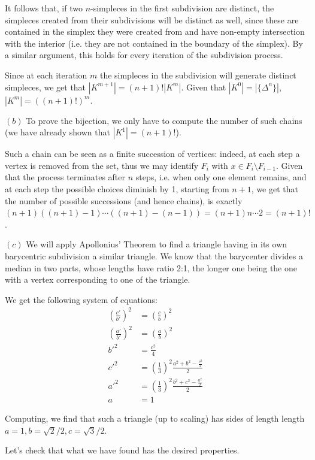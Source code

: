 \documentclass{article}
\begin{document}
It follows that, if two $n$-simpleces in the first subdivision are distinct, the simpleces created from their subdivisions will be distinct as well, since these are contained in the simplex they were created from and have non-empty intersection with the interior (i.e. they are not contained in the boundary of the simplex). By a similar argument, this holds for every iteration of the subdivision process.

Since at each iteration $m$ the simpleces in the subdivision will generate distinct simpleces, we get that $|K^{m+1}|=(n+1)!|K^m|$. Given that $|K^0|=|\{\Delta^n\}|$, $|K^m|=((n+1)!)^m$.

$(b)$ To prove the bijection, we only have to compute the number of such chains (we have already shown that $|K^1|=(n+1)!$).

Such a chain can be seen as a finite succession of vertices: indeed, at each step a vertex is removed from the set, thus we may identify $F_i$ with $x\in F_i\setminus F_{i-1}$. Given that the process terminates after $n$ steps, i.e. when only one element remains, and at each step the possible choices diminish by 1, starting from $n+1$, we get that the number of possible successions (and hence chains), is exactly $(n+1)((n+1)-1)\cdots ((n+1)-(n-1))=(n+1)n\cdots 2=(n+1)!$.

$(c)$ We will apply Apollonius' Theorem to find a triangle having in its own barycentric subdivision a similar triangle. We know that the barycenter divides a median in two parts, whose lengths have ratio 2:1, the longer one being the one with a vertex corresponding to one of the triangle.

We get the following system of equations:
\begin{align*}
		(\frac{c'}{b'})^2 & =(\frac{c}{b})^2 \\
		(\frac{a'}{b'})^2 & =(\frac{a}{b})^2 \\
		b'^2 & =\frac{c^2}{4} \\
		c'^2 & =(\frac{1}{3})^2\frac{a^2+b^2-\frac{c^2}{2}}{2} \\
		a'^2 & =(\frac{1}{3})^2\frac{b^2+c^2-\frac{a^2}{2}}{2} \\
		a & =1
\end{align*}

Computing, we find that such a triangle (up to scaling) has sides of length length $a=1,b=\sqrt{2}/2,c=\sqrt{3}/2$.

Let's check that what we have found has the desired properties.
\end{document}
